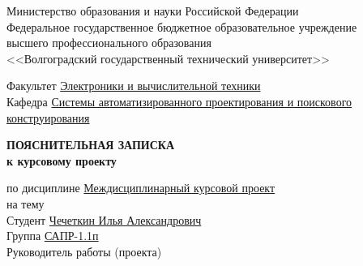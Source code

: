 \begin{titlepage}
    \begin{center}
        Министерство образования и науки Российской Федерации \\
        Федеральное государственное бюджетное образовательное учреждение\\
        высшего профессионального образования\\
        <<Волгоградский государственный технический университет>>\\
    \end{center}
    Факультет \underline{\hspace{1cm}Электроники и вычислительной техники\hspace{4.75cm}}\\
    Кафедра \underline{\hspace{1.4cm}Системы автоматизированного проектирования и поискового\hspace{0.3cm}}\\
    \underline{конструирования\hspace{13.3cm}}
    \vspace{1cm}
    \begin{center}
        \large \MakeUppercase{\textbf{пояснительная записка}} \\
        \normalsize\vspace{-0.2cm}\textbf{к курсовому проекту}
    \end{center}
    \begin{flushleft}
        по дисциплине \underline{\hspace{1cm}Междисциплинарный курсовой проект\hspace{4.1cm}}\\
        на тему \underline{\hspace{15.2cm}}\\
        \underline{\hspace{\textwidth}}
        Студент \underline{\hspace{1cm}Чечеткин Илья Александрович\hspace{2cm}} \\
        Группа \underline{\hspace{1cm}САПР-1.1п\hspace{2cm}}\\
        Руководитель работы (проекта) \underline{\hspace{5cm}}
            \hspace{0.5cm} \underline{\hspace{4.2cm}}\\

\end{flushleft}
\end{titlepage}
